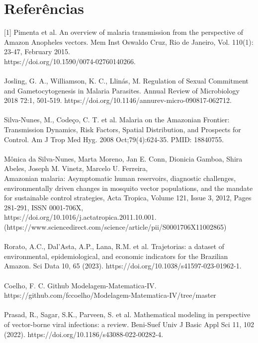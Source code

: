 \documentclass[12pt]{article}
\begin{document}
\section{Referências}
[1] Pimenta et al. An overview of malaria transmission from the perspective of Amazon $\text{Anopheles vectors}$. Mem Inst Oswaldo Cruz, Rio de Janeiro, Vol. 110(1): 23-47, February 2015. 
\\https://doi.org/10.1590/0074-02760140266.  
\\\\
\noindent [2] Josling, G. A., Williamson, K. C., Llinás, M. Regulation of Sexual Commitment and Gametocytogenesis in Malaria Parasites. Annual Review of Microbiology 2018 72:1, 501-519. https://doi.org/10.1146/annurev-micro-090817-062712. 
\\\\
\noindent [3] Silva-Nunes, M., Codeço, C. T. et al. Malaria on the Amazonian Frontier: Transmission Dynamics, Risk Factors, Spatial Distribution, and Prospects for Control. Am J Trop Med Hyg. 2008 Oct;79(4):624-35. PMID: 18840755.
\\\\
\noindent [4] Mônica da Silva-Nunes, Marta Moreno, Jan E. Conn, Dionicia Gamboa, Shira Abeles, Joseph M. Vinetz, Marcelo U. Ferreira,
\\Amazonian malaria: Asymptomatic human reservoirs, diagnostic challenges, environmentally driven changes in mosquito vector populations, and the mandate for sustainable control strategies,
Acta Tropica,
Volume 121, Issue 3,
2012,
Pages 281-291,
ISSN 0001-706X,
\\https://doi.org/10.1016/j.actatropica.2011.10.001.
\\
(https://www.sciencedirect.com/science/article/pii/S0001706X11002865)
\\\\
\noindent [5] Rorato, A.C., Dal’Asta, A.P., Lana, R.M. et al. Trajetorias: a dataset of environmental, epidemiological, and economic indicators for the Brazilian Amazon. Sci Data 10, 65 (2023). https://doi.org/10.1038/s41597-023-01962-1.
\\\\
\noindent [6] Coelho, F. C. Github Modelagem-Matematica-IV. \\ https://github.com/fccoelho/Modelagem-Matematica-IV/tree/master
\\\\
\noindent [7] Prasad, R., Sagar, S.K., Parveen, S. et al. Mathematical modeling in perspective of vector-borne viral infections: a review. Beni-Suef Univ J Basic Appl Sci 11, 102 (2022). https://doi.org/10.1186/s43088-022-00282-4.
\end{document}
